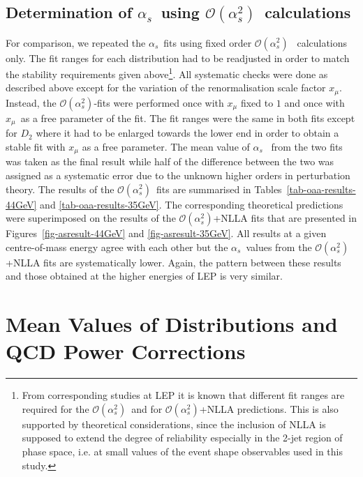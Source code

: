 \documentclass[12pt,a4paper,twoside]{article}
\newcommand{\as}     {\ensuremath{\alpha_s}}
\newcommand{\oaa}    {\ensuremath{\mathcal{O}(\alpha_s^2)}}
\newcommand{\xmu}    {\ensuremath{x_{\mu}}}
\begin{document}
\subsection{ Determination of \as\ using \oaa\ calculations}
For comparison, we repeated the \as\ fits using fixed order \oaa\ %
calculations only. 
The fit ranges for each distribution had to be readjusted in order to
match the stability requirements given above\footnote{From corresponding
studies at LEP \cite{bib-OPALresummed,bib-globalalphas} it is known that
different fit ranges are required for the \oaa\ and for \oaa +NLLA
predictions. This is also supported by theoretical considerations, since
the inclusion of NLLA is supposed to extend the degree of reliability
especially in the 2-jet region of phase space, i.e. at small values of the
event shape observables used in this study.}.
All systematic checks were done as described 
above except for the variation of the renormalisation scale factor \xmu.
Instead, the \oaa-fits were performed once with $\xmu$ fixed to $1$ 
and once with \xmu\ as a free parameter of the fit. 
The fit ranges were the same in both fits except for $D_2$ where it had to    %
be enlarged towards the lower end in order to obtain a stable fit with $\xmu$ %
as a free parameter.                                                          %
The mean value of \as\ %
from the two fits was taken as the final result while half of the difference 
between the two was assigned as a systematic error due to the
unknown higher orders in perturbation theory. 
The results of the \oaa\ fits are summarised
in Tables~\ref{tab-oaa-results-44GeV} and \ref{tab-oaa-results-35GeV}.
The corresponding theoretical predictions 
were superimposed on the results of the \oaa+NLLA fits that are 
presented in Figures~\ref{fig-asresult-44GeV} and \ref{fig-asresult-35GeV}. 
All results at a given centre-of-mass energy agree with each other but
the \as\ values from the \oaa+NLLA fits are systematically lower.
Again, the pattern between these results and those obtained at
the higher energies of LEP \cite{bib-globalalphas} is very similar.

\section{Mean Values of Distributions and QCD Power Corrections}
\label{sec-meanvalues}
\end{document}
